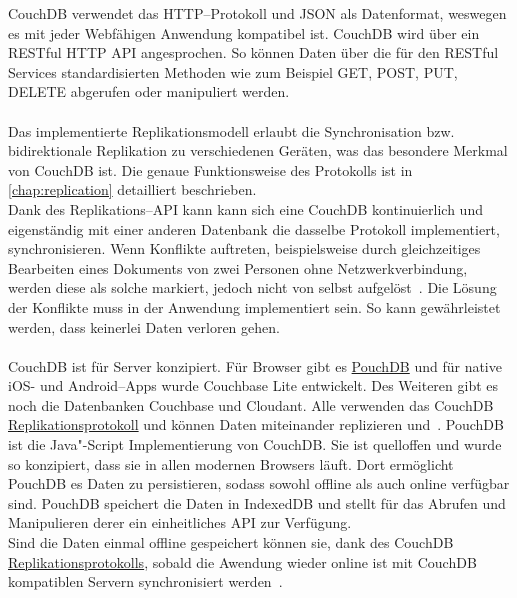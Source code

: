 CouchDB verwendet das \gls{HTTP}--Protokoll und \gls{JSON} als Datenformat, weswegen es mit jeder Webfähigen Anwendung kompatibel ist. CouchDB wird über ein \gls{REST}ful \gls{HTTP} \gls{API} angesprochen. So können Daten über die für den \gls{REST}ful Services standardisierten Methoden wie zum Beispiel GET, POST, PUT, DELETE abgerufen oder manipuliert werden.\\\\
%
%
Das implementierte Replikationsmodell erlaubt die Synchronisation bzw. bidirektionale Replikation zu verschiedenen Geräten, was das besondere Merkmal von CouchDB ist.
Die genaue Funktionsweise des Protokolls ist in \autoref{chap:replication} detailliert beschrieben.\\
% 
Dank des Replikations--\gls{API} kann kann sich eine CouchDB kontinuierlich und eigenständig mit einer anderen Datenbank die dasselbe Protokoll implementiert, synchronisieren.
Wenn Konflikte auftreten, beispielsweise durch gleichzeitiges Bearbeiten eines Dokuments von zwei Personen ohne Netzwerkverbindung, werden diese als solche markiert, jedoch nicht von selbst aufgelöst~\cite{couch}. Die Lösung der Konflikte muss in der Anwendung implementiert sein.
So kann gewährleistet werden, dass keinerlei Daten verloren gehen.\\\\
%
%
CouchDB ist für Server konzipiert. Für Browser gibt es \hyperref[chap:pouch]{PouchDB} und für native iOS- und Android--\glspl{App} wurde Couchbase Lite entwickelt.
Des Weiteren gibt es noch die Datenbanken Couchbase und Cloudant.
Alle verwenden das CouchDB \hyperref[chap:replication]{Replikationsprotokoll} und können Daten miteinander replizieren und~\cite{couch}.
%
%
PouchDB ist die Java"-Script Implementierung von CouchDB.
Sie ist quelloffen und wurde so konzipiert, dass sie in allen modernen Browsers läuft. Dort ermöglicht PouchDB es Daten zu persistieren, sodass sowohl offline als auch online verfügbar sind.
PouchDB speichert die Daten in IndexedDB und stellt für das Abrufen und Manipulieren derer ein einheitliches \gls{API} zur Verfügung.\\
Sind die Daten einmal offline gespeichert können sie, dank des CouchDB \hyperref[chap:replication]{Replikationsprotokolls}, sobald die Awendung wieder online ist mit CouchDB kompatiblen Servern synchronisiert werden~\cite{pouch}.